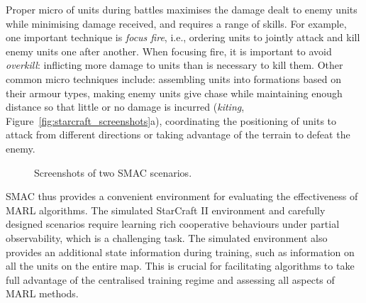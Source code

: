 \documentclass[twoside,11pt]{article}
\begin{document}
Proper micro of units during battles maximises the damage dealt to enemy units while minimising damage received, and requires a range of skills.
For example, one important technique is \textit{focus fire}, i.e., ordering units to jointly attack and kill enemy units one after another. When focusing fire, it is important to avoid \textit{overkill}: inflicting more damage to units than is necessary to kill them.
Other common micro techniques include: assembling units into formations based on their armour types, making enemy units give chase while maintaining enough distance so that little or no damage is incurred (\textit{kiting},  Figure~\ref{fig:starcraft_screenshots}a), coordinating the positioning of units to attack from different directions or taking advantage of the terrain to defeat the enemy.

\begin{figure}[t!]
	\centering
	\caption{\label{fig:SC2maps_2}Screenshots of two SMAC scenarios.}
\end{figure}

SMAC thus provides a convenient environment for evaluating the effectiveness of MARL algorithms. The simulated StarCraft II environment and carefully designed scenarios require learning rich cooperative behaviours under partial observability, which is a challenging task. The simulated environment also provides an additional state information during training, such as information on all the units on the entire map. This is crucial for facilitating algorithms to take full advantage of the centralised training regime and assessing all aspects of MARL methods.
\end{document}
